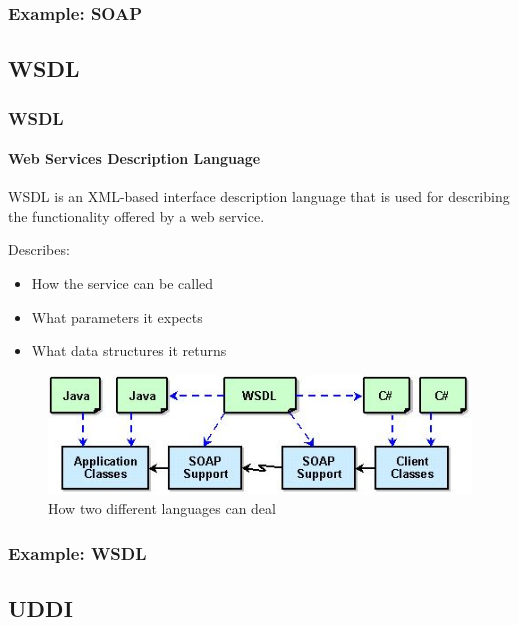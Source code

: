 \documentclass{beamer}
\begin{document}
\begin{frame}
\frametitle{Example: SOAP} 

\end{frame}


\subsection[Short First Subsection Name]{WSDL}

\begin{frame}
\frametitle{WSDL}
\framesubtitle{Web Services Description Language}
WSDL is an XML-based interface description language that is used 
for describing the functionality offered by a web service.

Describes:
\begin{itemize}
  \item How the service can be called 
  \item What parameters it expects
  \item What data structures it returns
\end{itemize}

\begin{figure}
\centering
\includegraphics{../pics/wsdl.jpg}
\caption{How two different languages can deal}
\label{overflow}
\end{figure}

\end{frame}

\begin{frame}
\frametitle{Example: WSDL} 

\end{frame}


\subsection[Short First Subsection Name]{UDDI}
\end{document}

